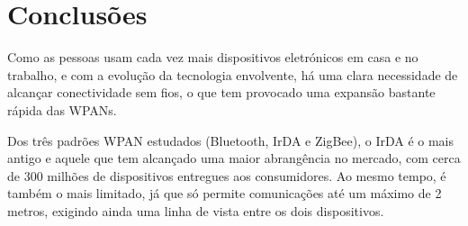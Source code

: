 \documentclass[conference]{IEEEtran}
\begin{document}




\section{Conclusões} \label{conclusoes}

Como as pessoas usam cada vez mais dispositivos eletrónicos em casa e no trabalho, e com a evolução da tecnologia envolvente, há uma clara necessidade de alcançar conectividade sem fios, o que tem provocado uma expansão bastante rápida das WPANs.

Dos três padrões WPAN estudados (Bluetooth, IrDA e ZigBee), o IrDA é o mais antigo e aquele que tem alcançado uma maior abrangência no mercado, com cerca de 300 milhões de dispositivos entregues aos consumidores. Ao mesmo tempo, é também o mais limitado, já que só permite comunicações até um máximo de 2 metros, exigindo ainda uma linha de vista entre os dois dispositivos.
\end{document}
